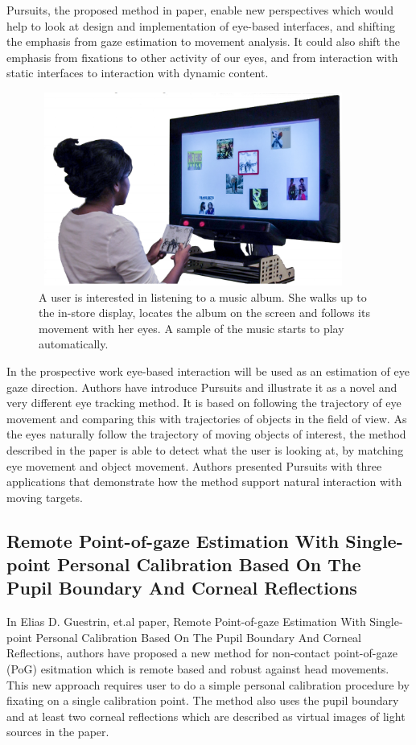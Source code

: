 Pursuits, the proposed method in paper, enable new perspectives which would help to look at design and implementation of eye-based interfaces, and shifting the emphasis from gaze estimation to movement analysis. It could also shift the emphasis from fixations to other activity of our eyes, and from interaction with static interfaces to interaction with dynamic content.\\

\begin{figure}[!hbt]
  \centering
  \includegraphics[width=4in,height=2.5in]{melodie2.png}
  \caption{A user is interested in listening to a music album. She walks up to the in-store display, locates the album on the screen and follows its movement with her eyes. A sample of the music starts to play automatically.}
  \label{melodie2}
\end{figure}

In the prospective work eye-based interaction will be used as an estimation of eye gaze direction. Authors have introduce Pursuits and illustrate it as a novel and very different eye tracking method. It is based on following the trajectory of eye movement and comparing this with trajectories of objects in the field of view. As the eyes naturally follow the trajectory of moving objects of interest, the method described in the paper is able to detect what the user is looking at, by matching eye movement and object movement. Authors presented Pursuits with three applications that demonstrate how the method support natural interaction with moving targets.

\subsection{Remote Point-of-gaze Estimation With Single-point Personal Calibration Based On The Pupil Boundary And Corneal Reflections}

In Elias D. Guestrin, et.al \cite{23} paper, Remote Point-of-gaze Estimation With Single-point Personal Calibration Based On The Pupil Boundary And Corneal Reflections, authors have proposed a new method for non-contact point-of-gaze (PoG) esitmation which is remote based and robust against head movements. This new approach requires user to do a simple personal calibration procedure by fixating on a single calibration point. The method also uses the pupil boundary and at least two corneal reflections which are described as virtual images of light sources in the paper.\\

